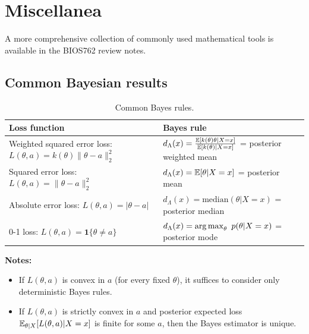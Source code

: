 \section{Miscellanea}

A more comprehensive collection of commonly used mathematical tools is available in the BIOS762 review notes.


\subsection{Common Bayesian results}
\begin{table}[!ht]
    \centering
    \begin{tabular}{l|l}
        \toprule
        \textbf{Loss function} & \textbf{Bayes rule} \\
        \midrule
        Weighted squared error loss: $L(\theta, a) = k(\theta) \|\theta-a\|_2^2$\quad & $d_\Lambda(x) = \frac{\mathbb{E}[k(\theta) \theta|X=x]}{\mathbb{E}[k(\theta)|X=x]}$ = posterior weighted mean\\
        \midrule
        Squared error loss: $L(\theta, a) = \|\theta-a\|_2^2$ &  $d_\Lambda(x) = \mathbb{E}[\theta | X=x]$ = posterior mean\\
        \midrule
        Absolute error loss: $L(\theta, a) = |\theta - a|$ & $d_\Lambda(x) = \text{median}(\theta|X=x)$ = posterior median\\
        \midrule
        0-1 loss: $L(\theta, a) = \mathbf{1}\{\theta \neq a\}$ & $d_\Lambda(x) = \operatorname*{arg\,max}_\theta\ p(\theta|X=x)$ = posterior mode\\
        \bottomrule
    \end{tabular}
    \caption{Common Bayes rules.}
    \label{tab:common_bayes_rules}
\end{table}

\textbf{Notes:}
\begin{itemize}
    \item If $L(\theta,a)$ is convex in $a$ (for every fixed $\theta$), it suffices to consider only deterministic Bayes rules.
    \item If $L(\theta,a)$ is strictly convex in $a$ and posterior expected loss $\mathbb{E}_{\theta|X}[L(\theta,a)|X=x]$ is finite for some $a$, then the Bayes estimator is unique.
\end{itemize}



